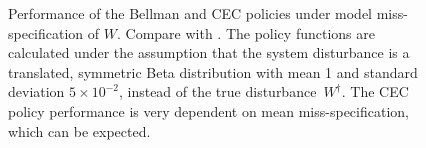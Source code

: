 \documentclass[main.tex]{subfiles}
\begin{document}
\begin{figure}[htbp]
\begin{subfigure}[b]{0.5\textwidth}
  \end{subfigure}\hfill
  \begin{subfigure}[b]{0.5\textwidth}
  \end{subfigure}
  \caption{Performance of the Bellman and CEC policies under model
    miss-specification of
    $W$. Compare with .
    The policy functions are calculated under the assumption that
    the system disturbance is a translated, symmetric Beta
    distribution with mean 1
    and standard deviation $5\times 10^{-2}$, instead
    of the true disturbance~$W^\dagger$.
    The CEC policy performance is very dependent on mean miss-specification,
    which can be expected.
  }\label{fig:markdown_bellman_mpc_model_misspecification}
\end{figure}
\end{document}
